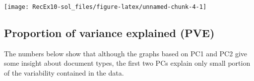 \documentclass[]{article}
\newenvironment{Shaded}{\begin{snugshade}}{\end{snugshade}}
\newcommand{\DataTypeTok}[1]{\textcolor[rgb]{0.13,0.29,0.53}{#1}}
\newcommand{\DecValTok}[1]{\textcolor[rgb]{0.00,0.00,0.81}{#1}}
\newcommand{\KeywordTok}[1]{\textcolor[rgb]{0.13,0.29,0.53}{\textbf{#1}}}
\newcommand{\NormalTok}[1]{#1}
\newcommand{\OperatorTok}[1]{\textcolor[rgb]{0.81,0.36,0.00}{\textbf{#1}}}
\newcommand{\OtherTok}[1]{\textcolor[rgb]{0.56,0.35,0.01}{#1}}
\newcommand{\StringTok}[1]{\textcolor[rgb]{0.31,0.60,0.02}{#1}}
\begin{document}
\begin{Shaded}
\end{Shaded}

\begin{center}\texttt{[image: RecEx10-sol\_files/figure-latex/unnamed-chunk-4-1]} \end{center}

\hypertarget{proportion-of-variance-explained-pve}{%
\subsection{Proportion of variance explained
(PVE)}\label{proportion-of-variance-explained-pve}}

The numbers below show that although the graphs based on PC1 and PC2
give some insight about document types, the first two PCs explain only
small portion of the variability contained in the data.

\begin{Shaded}
\end{Shaded}
\end{document}

